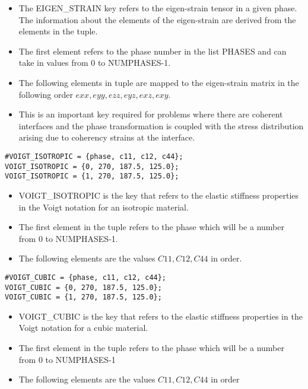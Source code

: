 \documentclass[a4paper,10pt]{article}
\begin{document}
\begin{itemize}
 \item The EIGEN\_STRAIN key refers to the eigen-strain tensor in a given phase. The information about the elements of the eigen-strain are derived from the elements in the tuple. 
 \item The first element refers to the phase number in the list PHASES and can take in values from 0 to NUMPHASES-1.
 \item The following elements in tuple are mapped to the eigen-strain matrix in the following order $exx, eyy, ezz, eyz, exz, exy$.
 \item This is an important key required for problems where there are coherent interfaces and the phase transformation is coupled with the stress distribution arising due to coherency strains at the interface.
\end{itemize}


\begin{lstlisting}
#VOIGT_ISOTROPIC = {phase, c11, c12, c44};
VOIGT_ISOTROPIC = {0, 270, 187.5, 125.0};
VOIGT_ISOTROPIC = {1, 270, 187.5, 125.0};
\end{lstlisting}

\begin{itemize}
 \item VOIGT\_ISOTROPIC is the key that refers to the elastic stiffness properties in the Voigt notation for an isotropic material. 
 \item The first element in the tuple refers to the phase which will be a number from 0 to NUMPHASES-1.
 \item The following elements are the values $C11,C12,C44$ in order.
\end{itemize}


\begin{lstlisting}
#VOIGT_CUBIC = {phase, c11, c12, c44};
VOIGT_CUBIC = {0, 270, 187.5, 125.0};
VOIGT_CUBIC = {1, 270, 187.5, 125.0};
\end{lstlisting}

\begin{itemize}
 \item VOIGT\_CUBIC is the key that refers to the elastic stiffness properties in the Voigt notation for a cubic material. 
 \item The first element in the tuple refers to the phase which will be a number from 0 to NUMPHASES-1
 \item The following elements are the values $C11,C12,C44$ in order
\end{itemize}
\end{document}
